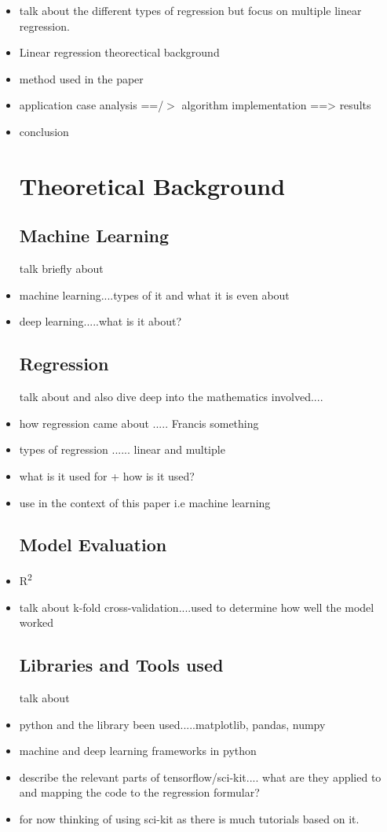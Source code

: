 \documentclass[conference]{IEEEtran}
\begin{document}
\begin{itemize}
\item talk about the different types of regression but focus on multiple linear regression.
\item Linear regression theorectical background
\item method used in the paper
\item application case analysis ==/$>$ algorithm implementation ==> results
\item conclusion

\section{Theoretical Background}

\subsection{Machine Learning}
talk briefly about 
\item machine learning....types of it and what it is even about
\item deep learning.....what is it about?

\subsection{Regression}
talk about and also dive deep into the mathematics involved....
\item how regression came about ..... Francis something
\item types of regression ...... linear and multiple
\item what is it used for + how is it used?
\item use in the context of this paper i.e machine learning


\subsection{Model Evaluation}
\item R\textsuperscript{2}
\item talk about k-fold cross-validation....used to determine how well the model worked

\subsection{Libraries and Tools used}
talk about 
\item python and the library been used.....matplotlib, pandas, numpy\
\item machine and deep learning frameworks in python
\item describe the relevant parts of tensorflow/sci-kit.... what are they applied to and mapping the code to the regression formular?
\item for now thinking of using sci-kit as there is much tutorials based on it.


\end{itemize}
\end{document}

